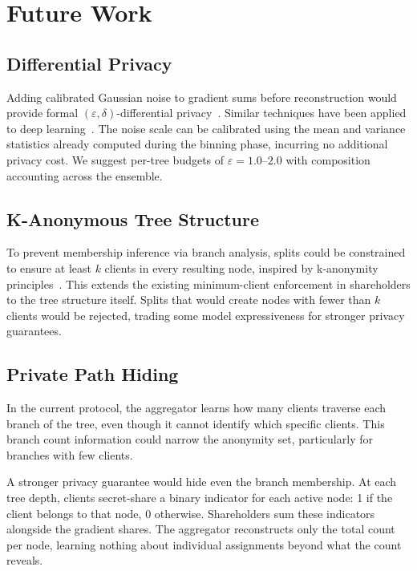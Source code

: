 \documentclass[journal,10pt]{IEEEtran}
\begin{document}
\section{Future Work}

\subsection{Differential Privacy}

Adding calibrated Gaussian noise to gradient sums before reconstruction would provide formal $(\varepsilon, \delta)$-differential privacy~\cite{dwork2014}. Similar techniques have been applied to deep learning~\cite{abadi2016}. The noise scale can be calibrated using the mean and variance statistics already computed during the binning phase, incurring no additional privacy cost. We suggest per-tree budgets of $\varepsilon = 1.0$--$2.0$ with composition accounting across the ensemble.

\subsection{K-Anonymous Tree Structure}
\label{sec:k-anonymous}

To prevent membership inference via branch analysis, splits could be constrained to ensure at least $k$ clients in every resulting node, inspired by k-anonymity principles~\cite{sweeney2002}. This extends the existing minimum-client enforcement in shareholders to the tree structure itself. Splits that would create nodes with fewer than $k$ clients would be rejected, trading some model expressiveness for stronger privacy guarantees.

\subsection{Private Path Hiding}
\label{sec:path-hiding}

In the current protocol, the aggregator learns how many clients traverse each branch of the tree, even though it cannot identify which specific clients. This branch count information could narrow the anonymity set, particularly for branches with few clients.

A stronger privacy guarantee would hide even the branch membership. At each tree depth, clients secret-share a binary indicator for each active node: 1 if the client belongs to that node, 0 otherwise. Shareholders sum these indicators alongside the gradient shares. The aggregator reconstructs only the total count per node, learning nothing about individual assignments beyond what the count reveals.
\end{document}
